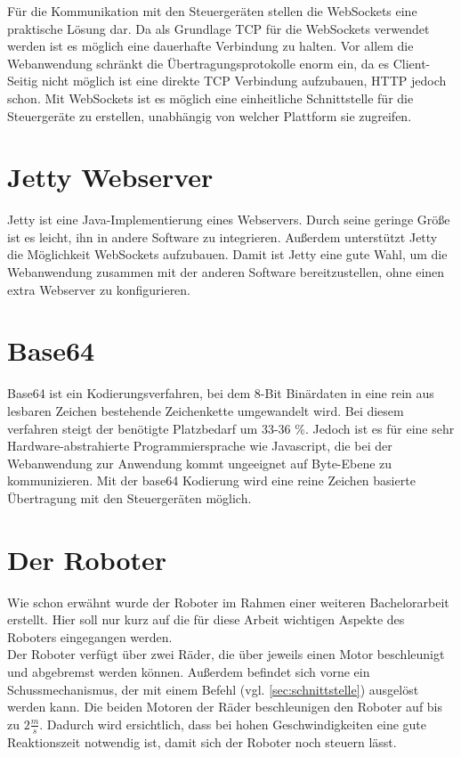Für die Kommunikation mit den Steuergeräten stellen die WebSockets eine praktische Lösung dar. Da als Grundlage TCP für die WebSockets verwendet werden ist es möglich eine dauerhafte Verbindung zu halten. Vor allem die Webanwendung schränkt die Übertragungsprotokolle enorm ein, da es Client-Seitig nicht möglich ist eine direkte TCP Verbindung aufzubauen, HTTP jedoch schon. Mit WebSockets ist es möglich eine einheitliche Schnittstelle für die Steuergeräte zu erstellen, unabhängig von welcher Plattform sie zugreifen.



\section{Jetty Webserver}
Jetty \cite{JETTY} ist eine Java-Implementierung eines Webservers. Durch seine geringe Größe ist es leicht, ihn in andere Software zu integrieren. Außerdem unterstützt Jetty die Möglichkeit WebSockets aufzubauen. Damit ist Jetty eine gute Wahl, um die Webanwendung zusammen mit der anderen Software bereitzustellen, ohne einen extra Webserver zu konfigurieren.



\section{Base64}
Base64 ist ein Kodierungsverfahren, bei dem 8-Bit Binärdaten in eine rein aus lesbaren Zeichen bestehende Zeichenkette umgewandelt wird. Bei diesem verfahren steigt der benötigte Platzbedarf um 33-36 \%. Jedoch ist es für eine sehr Hardware-abstrahierte Programmiersprache wie Javascript, die bei der Webanwendung zur Anwendung kommt ungeeignet auf Byte-Ebene zu kommunizieren. Mit der base64 Kodierung wird eine reine Zeichen basierte Übertragung mit den Steuergeräten möglich.

\section{Der Roboter}
Wie schon erwähnt wurde der Roboter im Rahmen einer weiteren Bachelorarbeit erstellt. Hier soll nur kurz auf die für diese Arbeit wichtigen Aspekte des Roboters eingegangen werden. \\
Der Roboter verfügt über zwei Räder, die über jeweils einen Motor beschleunigt und abgebremst werden können. Außerdem befindet sich vorne ein Schussmechanismus, der mit einem Befehl (vgl. \ref{sec:schnittstelle}) ausgelöst werden kann. Die beiden Motoren der Räder beschleunigen den Roboter auf bis zu $2\frac{m}{s}$. Dadurch wird ersichtlich, dass bei hohen Geschwindigkeiten eine gute Reaktionszeit notwendig ist, damit sich der Roboter noch steuern lässt.